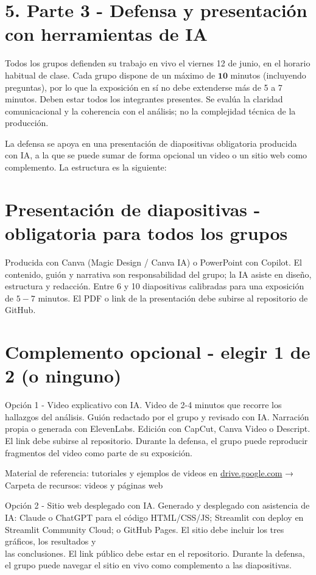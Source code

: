 \documentclass[10pt]{article}
\begin{document}
\section*{5. Parte 3 - Defensa y presentación con herramientas de IA}
Todos los grupos defienden su trabajo en vivo el viernes 12 de junio, en el horario habitual de clase. Cada grupo dispone de un máximo de $\mathbf{1 0}$ minutos (incluyendo preguntas), por lo que la exposición en sí no debe extenderse más de 5 a 7 minutos. Deben estar todos los integrantes presentes. Se evalúa la claridad comunicacional y la coherencia con el análisis; no la complejidad técnica de la producción.

La defensa se apoya en una presentación de diapositivas obligatoria producida con IA, a la que se puede sumar de forma opcional un video o un sitio web como complemento. La estructura es la siguiente:

\section*{Presentación de diapositivas - obligatoria para todos los grupos}
Producida con Canva (Magic Design / Canva IA) o PowerPoint con Copilot. El contenido, guión y narrativa son responsabilidad del grupo; la IA asiste en diseño, estructura y redacción. Entre 6 y 10 diapositivas calibradas para una exposición de $5-7$ minutos. El PDF o link de la presentación debe subirse al repositorio de GitHub.

\section*{Complemento opcional - elegir 1 de 2 (o ninguno)}
Opción 1 - Video explicativo con IA. Video de 2-4 minutos que recorre los hallazgos del análisis. Guión redactado por el grupo y revisado con IA. Narración propia o generada con ElevenLabs. Edición con CapCut, Canva Video o Descript. El link debe subirse al repositorio. Durante la defensa, el grupo puede reproducir fragmentos del video como parte de su exposición.

Material de referencia: tutoriales y ejemplos de videos en \href{http://drive.google.com}{drive.google.com} → Carpeta de recursos: videos y páginas web

Opción 2 - Sitio web desplegado con IA. Generado y desplegado con asistencia de IA: Claude o ChatGPT para el código HTML/CSS/JS; Streamlit con deploy en Streamlit Community Cloud; o GitHub Pages. El sitio debe incluir los tres gráficos, los resultados y\\
las conclusiones. El link público debe estar en el repositorio. Durante la defensa, el grupo puede navegar el sitio en vivo como complemento a las diapositivas.
\end{document}
